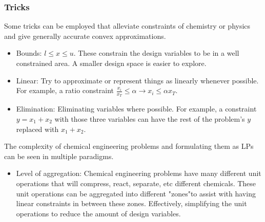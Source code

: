 \subsubsection{Tricks}
Some tricks can be employed that alleviate constraints of chemistry or physics and give generally accurate convex approximations.
\begin{itemize}
    \item Bounds: $l \leq x \leq u$. These constrain the design variables to be in a well constrained area. A smaller design space is easier to explore.
    \item Linear: Try to approximate or represent things as linearly whenever possible. For example, a ratio constraint $\frac{x_i}{x_T} \leq \alpha \rightarrow x_i \leq \alpha x_T$.
    \item Elimination: Eliminating variables where possible. For example, a constraint $y = x_1 + x_2$ with those three variables can have the rest of the problem's $y$ replaced with $x_1 + x_2$.
\end{itemize}
The complexity of chemical engineering problems and formulating them as LPs can be seen in multiple paradigms.
\begin{itemize}
    \item Level of aggregation: Chemical engineering problems have many different unit operations that will compress, react, separate, etc different chemicals. These unit operations can be aggregated into different "zones"to assist with having linear constraints in between these zones. Effectively, simplifying the unit operations to reduce the amount of design variables.
\end{itemize}